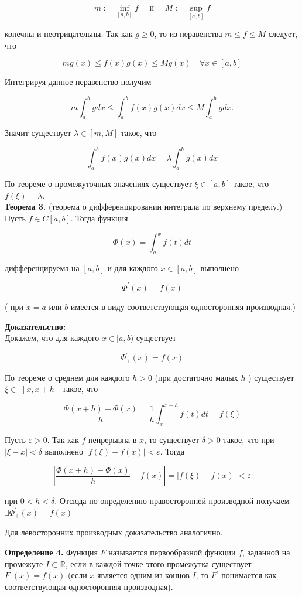 \documentclass[a4paper,12pt]{article} %
\begin{document}
	$$
	m:=\inf _{[a, b]} f \quad \text { и } \quad M:=\sup _{[a, b]} f
	$$
	
	конечны и неотрицательны. Так как $g \geq 0$, то из неравенства $m \leq f \leq M$ следует, что
	
	$$
	m g(x) \leq f(x) g(x) \leq M g(x) \quad \forall x \in[a, b]
	$$
	
	Интегрируя данное неравенство получим
	
	$$
	m \int_{a}^{b} g d x \leq \int_{a}^{b} f(x) g(x) d x \leq M \int_{a}^{b} g d x .
	$$
	
	Значит существует $\lambda \in[m, M]$ такое, что
	
	$$
	\int_{a}^{b} f(x) g(x) d x=\lambda \int_{a}^{b} g(x) d x
	$$
	
	По теореме о промежуточных значениях существует $\xi \in[a, b]$ такое, что $f(\xi)=\lambda$.\\
	\textbf{Теорема 3.} (теорема о дифференцировании интеграла по верхнему пределу.)\\ Пусть $f \in C[a, b]$. Тогда функция
	
	$$
	\Phi(x)=\int_{a}^{x} f(t) d t
	$$
	
	дифференцируема на $[a, b]$ и для каждого $x \in[a, b]$ выполнено
	
	$$
	\Phi^{\prime}(x)=f(x)
	$$
	
	( при $x=a$ или $b$ имеется в виду соответствующая односторонняя производная.)
	
	\textbf{Доказательство:\\}
	Докажем, что для каждого $x \in[a, b)$ существует
	
	$$
	\Phi_{+}^{\prime}(x)=f(x)
	$$
	
	По теореме о среднем для каждого $h>0$ (при достаточно малых $h$ ) существует $\xi \in$ $[x, x+h]$ такое, что
	
	$$
	\frac{\Phi(x+h)-\Phi(x)}{h}=\frac{1}{h} \int_{x}^{x+h} f(t) d t=f(\xi)
	$$
	
	Пусть $\varepsilon>0$. Так как $f$ непрерывна в $x$, то существует $\delta>0$ такое, что при $|\xi-x|<\delta$ выполнено $|f(\xi)-f(x)|<\varepsilon$. Тогда
	
	$$
	\left|\frac{\Phi(x+h)-\Phi(x)}{h}-f(x)\right|=|f(\xi)-f(x)|<\varepsilon
	$$
	
	при $0<h<\delta$. Отсюда по определению правосторонней производной получаем $\exists \Phi_{+}^{\prime}(x)=f(x)$
	
	Для левосторонних производных доказательство аналогично.
	
	\textbf{Определение 4.} Функция $F$ называется первообразной функции $f$, заданной на промежуте $I \subset \mathbb{R}$, если в каждой точке этого промежутка существует $F^{\prime}(x)=f(x)$ (если $x$ является одним из концов $I$, то $F^{\prime}$ понимается как соответствующая односторонняя производная).
	
\end{document}

